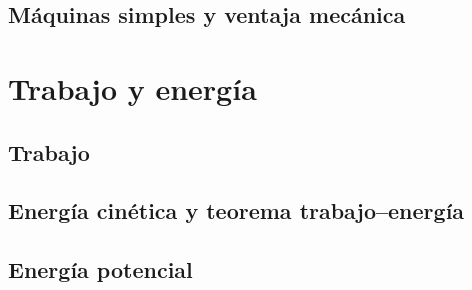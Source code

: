 ﻿\documentclass[11pt,letterpaper,openany]{book}
\newcommand{\rutaraiz}{../..}
\begin{document}




\chapter{Máquinas simples y ventaja mecánica}





\part{Trabajo y energía}



\chapter{Trabajo}





\chapter{Energía cinética y teorema trabajo--energía}





\chapter{Energía potencial}
\end{document}
